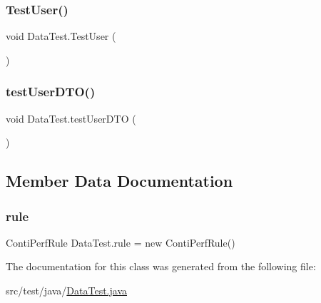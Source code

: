 \mbox{\label{class_data_test_a7eda1ff6b6607bd45d0a6db886378a29}} 
\subsubsection{\texorpdfstring{Test\+User()}{TestUser()}}
{\footnotesize\ttfamily void Data\+Test.\+Test\+User (\begin{DoxyParamCaption}{ }\end{DoxyParamCaption})}

\mbox{\label{class_data_test_a172bc3e2697560ea0ff26099e9dfd508}} 
\subsubsection{\texorpdfstring{test\+User\+D\+T\+O()}{testUserDTO()}}
{\footnotesize\ttfamily void Data\+Test.\+test\+User\+D\+TO (\begin{DoxyParamCaption}{ }\end{DoxyParamCaption})}



\subsection{Member Data Documentation}
\mbox{\label{class_data_test_a50a248830efac1fc97a7c63f8220c6ce}} 
\subsubsection{\texorpdfstring{rule}{rule}}
{\footnotesize\ttfamily Conti\+Perf\+Rule Data\+Test.\+rule = new Conti\+Perf\+Rule()}



The documentation for this class was generated from the following file\+:\begin{DoxyCompactItemize}
\item 
src/test/java/\mbox{\hyperlink{_data_test_8java}{Data\+Test.\+java}}\end{DoxyCompactItemize}
